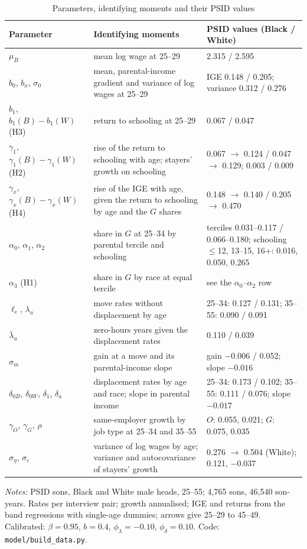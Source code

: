 \begin{table}[!htbp]
\centering
\caption{Parameters, identifying moments and their PSID values}\label{tab:modelid}
\footnotesize
\begin{tabular}{p{3.2cm}p{6.0cm}p{5.0cm}}
\toprule
Parameter & Identifying moments & PSID values (Black / White) \\
\midrule
$\mu_B$ & mean log wage at 25--29 & 2.315 / 2.595 \\
$b_0$, $b_x$, $\sigma_0$ & mean, parental-income gradient and variance of log wages at 25--29 & IGE 0.148 / 0.205; variance 0.312 / 0.276 \\
$b_1$, $b_1(B) - b_1(W)$ (H3) & return to schooling at 25--29 & 0.067 / 0.047 \\
$\gamma_1$, $\gamma_1(B) - \gamma_1(W)$ (H2) & rise of the return to schooling with age; stayers' growth on schooling & 0.067 $\to$ 0.124 / 0.047 $\to$ 0.129; 0.003 / 0.009 \\
$\gamma_x$, $\gamma_x(B) - \gamma_x(W)$ (H4) & rise of the IGE with age, given the return to schooling by age and the $G$ shares & 0.148 $\to$ 0.140 / 0.205 $\to$ 0.470 \\
$\alpha_0$, $\alpha_1$, $\alpha_2$ & share in $G$ at 25--34 by parental tercile and schooling & terciles 0.031--0.117 / 0.066--0.180; schooling $\le$12, 13--15, 16+: 0.016, 0.050, 0.265 \\
$\alpha_3$ (H1) & share in $G$ by race at equal tercile & see the $\alpha_0$--$\alpha_2$ row \\
$\ell_e$, $\lambda_a$ & move rates without displacement by age & 25--34: 0.127 / 0.131; 35--55: 0.090 / 0.091 \\
$\bar\lambda_u$ & zero-hours years given the displacement rates & 0.110 / 0.039 \\
$\sigma_m$ & gain at a move and its parental-income slope & gain $-0.006$ / 0.052; slope $-0.016$ \\
$\delta_{0B}$, $\delta_{0W}$, $\delta_1$, $\delta_a$ & displacement rates by age and race; slope in parental income & 25--34: 0.173 / 0.102; 35--55: 0.111 / 0.076; slope $-0.017$ \\
$\gamma_O$, $\gamma_G$, $\rho$ & same-employer growth by job type at 25--34 and 35--55 & $O$: 0.055, 0.021; $G$: 0.075, 0.035 \\
$\sigma_\eta$, $\sigma_\varepsilon$ & variance of log wages by age; variance and autocovariance of stayers' growth & 0.276 $\to$ 0.504 (White); 0.121, $-0.037$ \\
\bottomrule
\end{tabular}
\par\smallskip
\begin{minipage}{\textwidth}\footnotesize \textit{Notes:} PSID sons, Black and White male heads, 25--55; 4,765 sons,
46,540 son-years. Rates per interview pair; growth annualised; IGE and returns from the band regressions with
single-age dummies; arrows give 25--29 to 45--49. Calibrated: $\beta = 0.95$, $b = 0.4$, $\phi_\lambda = -0.10$,
$\phi_\delta = 0.10$. Code: \texttt{model/build\_data.py}.\end{minipage}
\end{table}


